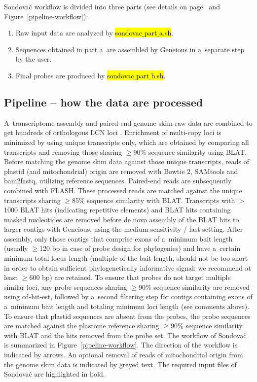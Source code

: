 \documentclass[a4paper, 11pt, twoside]{article}
\renewcommand{\texttt}[1]{\hl{\ttfamily #1}}
\begin{document}
Sondovač workflow is divided into three parts (see details on page~\pageref{pipeline-overview} and Figure~\ref{pipeline-workflow}):

\begin{enumerate}
\item Raw input data are analyzed by \texttt{sondovac$\_$part$\_$a.sh}.
\item Sequences obtained in part a~are assembled by Geneious in a~separate step by the user.
\item Final probes are produced by \texttt{sondovac$\_$part$\_$b.sh}.
\end{enumerate}

\subsection{Pipeline -- how the data are processed}

A~transcriptome assembly and paired-end genome skim raw data are combined to get hundreds of orthologous LCN loci \citep{Schmickl2016}. Enrichment of multi-copy loci is minimized by using unique transcripts only, which are obtained by comparing all transcripts and removing those sharing $\geq$90\% sequence similarity using BLAT. Before matching the genome skim data against those unique transcripts, reads of plastid (and mitochondrial) origin are removed with Bowtie 2, SAMtools and bam2fastq, utilizing reference sequences. Paired-end reads are subsequently combined with FLASH. These processed reads are matched against the unique transcripts sharing $\geq$85\% sequence similarity with BLAT. Transcripts with $>$1000 BLAT hits (indicating repetitive elements) and BLAT hits containing masked nucleotides are removed before de novo assembly of the BLAT hits to larger contigs with Geneious, using the medium sensitivity / fast setting. After assembly, only those contigs that comprise exons of a~minimum bait length (usually $\geq$120 bp in case of probe design for phylogenies) and have a~certain minimum total locus length (multiple of the bait length, should not be too short in order to obtain sufficient phylogenetically informative signal; we recommend at least $\geq$600 bp) are retained. To ensure that probes do not target multiple similar loci, any probe sequences sharing $\geq$90\% sequence similarity are removed using cd-hit-est, followed by a~second filtering step for contigs containing exons of a~minimum bait length and totaling minimum loci length (see comments above). To ensure that plastid sequences are absent from the probes, the probe sequences are matched against the plastome reference sharing $\geq$90\% sequence similarity with BLAT and the hits removed from the probe set. The workflow of Sondovač is summarized in Figure~\ref{pipeline-workflow}. The direction of the workflow is indicated by arrows. An optional removal of reads of mitochondrial origin from the genome skim data is indicated by greyed text. The required input files of Sondovač are highlighted in bold.
\end{document}
